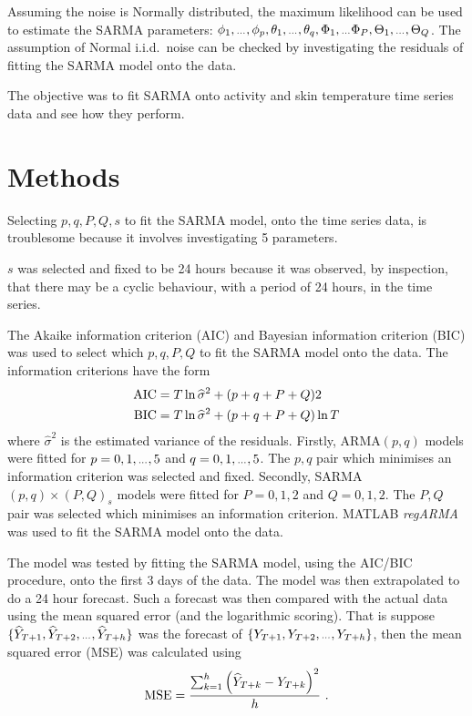 \documentclass[a4paper]{proc}
\newcommand{\dotdotdot}{\vphantom{.}_{\cdots}}
\begin{document}
Assuming the noise is Normally distributed, the maximum likelihood can be used to estimate the SARMA parameters: $\phi_1,\dotdotdot,\phi_p,\theta_1,\dotdotdot,\theta_q,\Phi_1,\dotdotdot\Phi_P,\Theta_1,\dotdotdot,\Theta_Q$. The assumption of Normal i.i.d.~noise can be checked by investigating the residuals of fitting the SARMA model onto the data.

The objective was to fit SARMA onto activity and skin temperature time series data and see how they perform.

\section{Methods}
Selecting $p,q,P,Q,s$ to fit the SARMA model, onto the time series data, is troublesome because it involves investigating 5 parameters.

$s$ was selected and fixed to be 24 hours because it was observed, by inspection, that there may be a cyclic behaviour, with a period of 24 hours, in the time series.

The Akaike information criterion (AIC) and Bayesian information criterion (BIC) was used to select which $p,q,P,Q$ to fit the SARMA model onto the data. The information criterions have the form
\begin{align}
\textup{AIC}&=T\ln{\widehat{\sigma}^2}+(p+q+P+Q)2\\
\textup{BIC}&=T\ln{\widehat{\sigma}^2}+(p+q+P+Q)\ln{T}
\end{align}
where $\widehat{\sigma}^2$ is the estimated variance of the residuals. Firstly, ARMA$(p,q)$ models were fitted for $p=0,1,\dotdotdot,5$ and $q=0,1,\dotdotdot,5$. The $p,q$ pair which minimises an information criterion was selected and fixed. Secondly, SARMA$(p,q)\times(P,Q)_s$ models were fitted for $P=0,1,2$ and $Q=0,1,2$. The $P,Q$ pair was selected which minimises an information criterion. MATLAB \emph{regARMA} was used to fit the SARMA model onto the data.

The model was tested by fitting the SARMA model, using the AIC/BIC procedure, onto the first 3 days of the data. The model was then extrapolated to do a 24 hour forecast. Such a forecast was then compared with the actual data using the mean squared error (and the logarithmic scoring). That is suppose $\{\widehat{Y}_{T+1},\widehat{Y}_{T+2},\dotdotdot,\widehat{Y}_{T+h}\}$ was the forecast of $\{{Y}_{T+1},{Y}_{T+2},\dotdotdot,{Y}_{T+h}\}$, then the mean squared error (MSE) was calculated using
\begin{equation}
\textup{MSE} = \frac{\sum_{k=1}^{h}\left(\widehat{Y}_{T+k}-Y_{T+k}\right)^2}{h} \ .
\end{equation}
\end{document}
